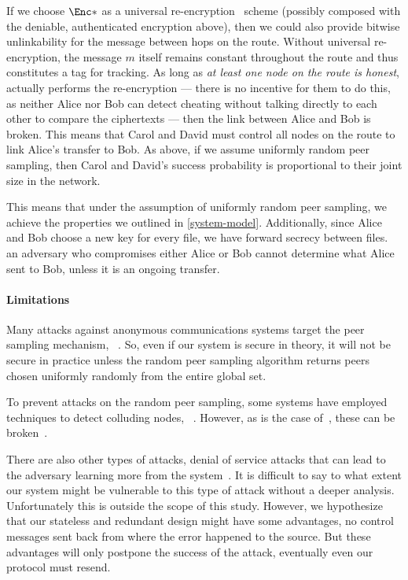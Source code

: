 If we choose \(\Enc*\) as a universal re-encryption~\cite{UniversalReencryption} 
scheme (possibly composed with the deniable, authenticated encryption above), 
then we could also provide bitwise unlinkability for the message between hops on 
the route.
Without universal re-encryption, the message \(m\) itself remains constant 
throughout the route and thus constitutes a tag for tracking.
As long as \emph{at least one node on the route is honest}, \ie actually 
performs the re-encryption --- there is no incentive for them to do this, as 
neither Alice nor Bob can detect cheating without talking directly to each other 
to compare the ciphertexts --- then the link between Alice and Bob is broken.
This means that Carol and David must control all nodes on the route to link 
Alice's transfer to Bob.
As above, if we assume uniformly random peer sampling, then Carol and David's 
success probability is proportional to their joint size in the network.

This means that under the assumption of uniformly random peer sampling, we 
achieve the properties we outlined in \cref{system-model}.
Additionally, since Alice and Bob choose a new key for every file, we have 
forward secrecy between files.
\Eg an adversary who compromises either Alice or Bob cannot determine what Alice 
sent to Bob, unless it is an ongoing transfer.

\paragraph*{Limitations}%
\label{security-limitations}

Many attacks against anonymous communications systems target the peer sampling 
mechanism, \eg~\cite{%
  RouteFingerprinting,%
  EpistemicAttacksOnRouteSelection,%
}.
So, even if our system is secure in theory, it will not be secure in practice 
unless the random peer sampling algorithm returns peers chosen uniformly 
randomly from the entire global set. %

To prevent attacks on the random peer sampling, some systems have employed 
techniques to detect colluding nodes, \eg~\cite{%
  SecurePeerSampling,%
  MorphMix,%
}.
However, as is the case of~\cite{MorphMix}, these can be 
broken~\cite{BreakingMorphMix}.

There are also other types of attacks, \eg denial of service attacks that can 
lead to the adversary learning more from the system~\cite{DenialOfSecurity}.
It is difficult to say to what extent our system might be vulnerable to this 
type of attack without a deeper analysis.
Unfortunately this is outside the scope of this study.
However, we hypothesize that our stateless and redundant design might have some 
advantages, \eg no control messages sent back from where the error happened to 
the source.
But these advantages will only postpone the success of the attack, eventually 
even our protocol must resend.

